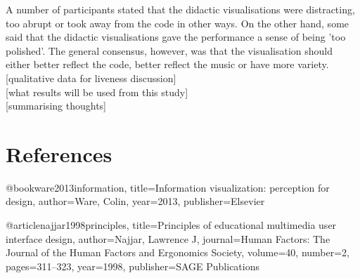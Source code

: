 \documentclass{article}
\begin{document}
A number of participants stated that the didactic visualisations were distracting, too abrupt or took away from the code in other ways. On the other hand, some said that the didactic visualisations gave the performance a sense of being 'too polished'. The general consensus, however, was that the visualisation should either better reflect the code, better reflect the music or have more variety.\\

[qualitative data for liveness discussion]\\

[what results will be used from this study]\\

[summarising thoughts]\\

\section{References}


@book{ware2013information,
  title={Information visualization: perception for design},
  author={Ware, Colin},
  year={2013},
  publisher={Elsevier}
}

@article{najjar1998principles,
  title={Principles of educational multimedia user interface design},
  author={Najjar, Lawrence J},
  journal={Human Factors: The Journal of the Human Factors and Ergonomics Society},
  volume={40},
  number={2},
  pages={311--323},
  year={1998},
  publisher={SAGE Publications}
}
\end{document}

